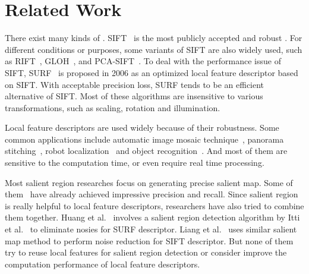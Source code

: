 \section{Related Work}

There exist many kinds of {\lfea}. SIFT~\cite{lowe1999object}\cite{lowe2004distinctive} is the most publicly accepted and robust {\lfea}. For different conditions or purposes, some variants of SIFT are also widely used, such as RIFT~\cite{lazebnik2005sparse}, GLOH~\cite{mikolajczyk2005performance}, and PCA-SIFT~\cite{ke2004pca}. To deal with the performance issue of SIFT, SURF~\cite{Bay2006SURF} is proposed in 2006 as an optimized local feature descriptor based on SIFT. With acceptable precision loss, SURF tends to be an efficient alternative of SIFT. Most of these algorithms are insensitive to various transformations, such as scaling, rotation and illumination.

Local feature descriptors are used widely because of their robustness. Some common applications include automatic image mosaic technique~\cite{yang2008image,salgian2007using}, panorama stitching~\cite{brown2003recognising,tang2008modified}, robot localization~\cite{se2001vision} and object recognition~\cite{heo2008illumination}. And most of them are sensitive to the computation time, or even require real time processing.

Most salient region researches focus on generating precise salient map. Some of them~\cite{cheng2011global,achanta2009frequency} have already achieved impressive precision and recall. Since salient region is really helpful to local feature descriptors, researchers have also tried to combine them together. Huang et al.~\cite{huang2009image} involves a salient region detection algorithm by Itti et al.~\cite{itti1998model} to eliminate nosies for SURF descriptor. Liang et al.~\cite{liang2010salient} uses similar salient map method to perform noise reduction for SIFT descriptor. But none of them try to reuse local features for salient region detection or consider improve the computation performance of local feature descriptors.